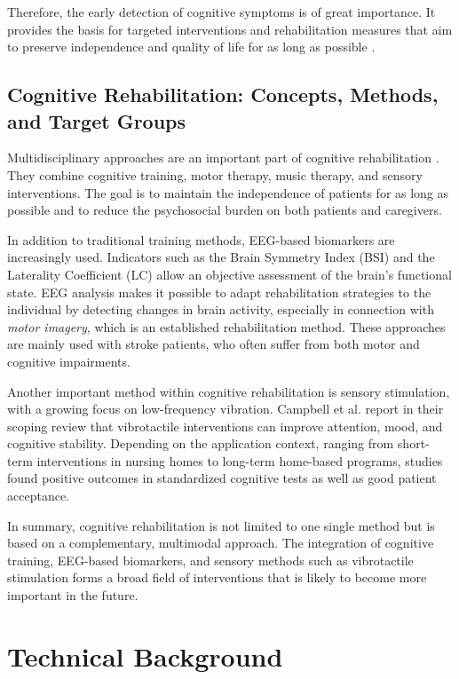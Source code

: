 Therefore, the early detection of cognitive symptoms is of great importance. It provides the basis for targeted interventions and rehabilitation measures that aim to preserve independence and quality of life for as long as possible \cite{Petersen.2009}.

\subsection{Cognitive Rehabilitation: Concepts, Methods, and Target Groups}
Multidisciplinary approaches are an important part of cognitive rehabilitation \cite{Zucchella.2018}.
They combine cognitive training, motor therapy, music therapy, and sensory interventions.
The goal is to maintain the independence of patients for as long as possible and to reduce the psychosocial burden on both patients and caregivers.

In addition to traditional training methods, EEG-based biomarkers are increasingly used.
Indicators such as the Brain Symmetry Index (BSI) and the Laterality Coefficient (LC) allow an objective assessment of the brain’s functional state.
EEG analysis makes it possible to adapt rehabilitation strategies to the individual by detecting changes in brain activity, especially in connection with \textit{motor imagery}, which is an established rehabilitation method.
These approaches are mainly used with stroke patients, who often suffer from both motor and cognitive impairments.

Another important method within cognitive rehabilitation is sensory stimulation, with a growing focus on low-frequency vibration.
Campbell et al. \cite{Campbell.2022} report in their scoping review that vibrotactile interventions can improve attention, mood, and cognitive stability.
Depending on the application context, ranging from short-term interventions in nursing homes to long-term home-based programs, studies found positive outcomes in standardized cognitive tests as well as good patient acceptance.

In summary, cognitive rehabilitation is not limited to one single method but is based on a complementary, multimodal approach.
The integration of cognitive training, EEG-based biomarkers, and sensory methods such as vibrotactile stimulation forms a broad field of interventions that is likely to become more important in the future.

\section{Technical Background}

